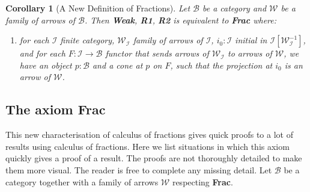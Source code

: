 \documentclass{article}
\numberwithin{equation}{section}
\theoremstyle{definition}
\theoremstyle{plain}
\newtheorem{corollary}[equation]{Corollary}
\begin{document}
\begin{corollary}[A New Definition of Fractions] Let $\mathcal{B}$ be a category and $\mathcal{W}$ be a family of arrows of $\mathcal{B}$. Then \textbf{Weak}, \textbf{R1}, \textbf{R2} is equivalent to \textbf{Frac} where:
	\begin{enumerate}
		\item[\textbf{Frac:}] for each $\mathcal{I}$ finite category, $\mathcal{W}_{\mathcal{I}}$ family of arrows of $\mathcal{I}$, $i_0:\mathcal{I}$ initial in $\mathcal{I}[\mathcal{W}_{\mathcal{I}}^{-1}]$, and for each $F:\mathcal{I} \to \mathcal{B}$ functor that sends arrows of $\mathcal{W}_{\mathcal{I}}$ to arrows of $\mathcal{W}$, we have an object $p:\mathcal{B}$ and a cone at $p$ on $F$, such that the projection at $i_0$ is an arrow of $\mathcal{W}$.
	\end{enumerate}
\end{corollary}

\subsection{The axiom \textbf{Frac}}

This new characterisation of calculus of fractions gives quick proofs to a lot of results using calculus of fractions. Here we list situations in which this axiom quickly gives a proof of a result. The proofs are not thoroughly detailed to make them more visual. The reader is free to complete any missing detail. Let $\mathcal{B}$ be a category together with a family of arrows $\mathcal{W}$ respecting \textbf{Frac}.
\end{document}
